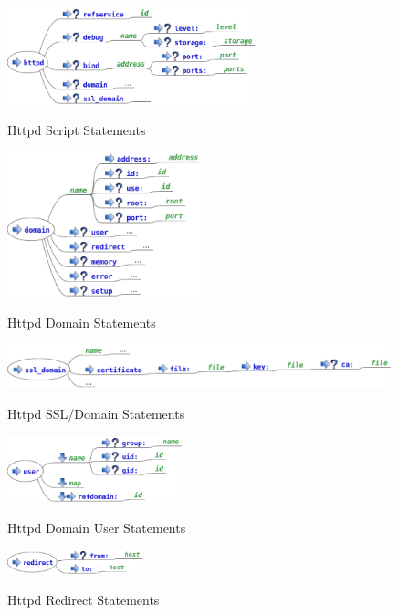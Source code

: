 \begin{figure}[htp]
\centering
\includegraphics[width=0.64\textwidth]{httpd_service_script}
\label{fig:httpd_service_script}
\caption{Httpd Script Statements}
\end{figure}

\begin{figure}[htp]
\centering
\includegraphics[width=0.5\textwidth]{httpd_domain_script}
\label{fig:httpd_domain_script}
\caption{Httpd Domain Statements}
\end{figure}

\begin{figure}[htp]
\centering
\includegraphics[width=0.99\textwidth]{httpd_ssldomain_script}
\label{fig:httpd_ssldomain_script}
\caption{Httpd SSL/Domain Statements}
\end{figure}

\begin{figure}[htp]
\centering
\includegraphics[width=0.45\textwidth]{httpd_user_script}
\label{fig:httpd_user_script}
\caption{Httpd Domain User Statements}
\end{figure}

\begin{figure}[htp]
\centering
\includegraphics[width=0.35\textwidth]{httpd_redirect_script}
\label{fig:httpd_redirect_script}
\caption{Httpd Redirect Statements}
\end{figure}


